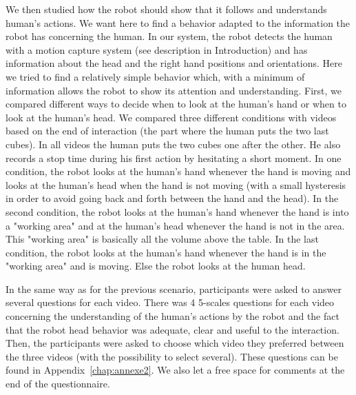 \documentclass[english,a4paper,11pt,twoside]{StyleThese}
\begin{document}
We then studied how the robot should show that it follows and understands human's actions. We want here to find a behavior adapted to the information the robot has concerning the human. In our system, the robot detects the human with a motion capture system (see description in Introduction) and has information about the head and the right hand positions and orientations. Here we tried to find a relatively simple behavior which, with a minimum of information allows the robot to show its attention and understanding. First, we compared different ways to decide when to look at the human's hand or when to look at the human's head. We compared three different conditions with videos based on the end of interaction (the part where the human puts the two last cubes). In all videos the human puts the two cubes one after the other. He also records a stop time during his first action by hesitating a short moment. In one condition, the robot looks at the human's hand whenever the hand is moving and looks at the human's head when the hand is not moving (with a small hysteresis in order to avoid going back and forth between the hand and the head). In the second condition, the robot looks at the human's hand whenever the hand is into a "working area" and at the human's head whenever the hand is not in the area. This "working area" is basically all the volume above the table. In the last condition, the robot looks at the human's hand whenever the hand is in the "working area" and is moving. Else the robot looks at the human head.

In the same way as for the previous scenario, participants were asked to answer several questions for each video. There was 4 5-scales questions for each video concerning the understanding of the human's actions by the robot and the fact that the robot head behavior was adequate, clear and useful to the interaction. Then, the participants were asked to choose which video they preferred between the three videos (with the possibility to select several). These questions can be found in Appendix~\ref{chap:annexe2}. We also let a free space for comments at the end of the questionnaire.
\end{document}
